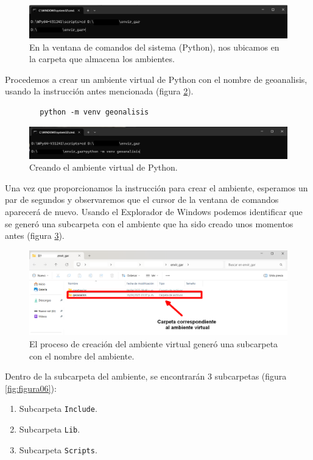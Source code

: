 \documentclass{article}
\begin{document}
	\begin{figure}[H]
		\centering
		\includegraphics[width=0.9\linewidth]{figura03}
		\caption{En la ventana de comandos del sistema (Python), nos ubicamos en la carpeta que almacena los ambientes.}
		\label{fig:figura03}
	\end{figure}
	
	Procedemos a crear un ambiente virtual de Python con el nombre de geoanalisis, usando la instrucción antes mencionada (figura \ref{fig:figura04}).
	\begin{verbatim}
		python -m venv geonalisis
	\end{verbatim}
	
	\begin{figure}[H]
		\centering
		\includegraphics[width=0.9\linewidth]{Figura04}
		\caption{Creando el ambiente virtual de Python.}
		\label{fig:figura04}
	\end{figure}
	
	Una vez que proporcionamos la instrucción para crear el ambiente, esperamos un par de segundos y observaremos que el cursor de la ventana de comandos aparecerá de nuevo. Usando el Explorador de Windows podemos identificar que se generó una subcarpeta con el ambiente que ha sido creado unos momentos antes (figura \ref{fig:figura05}).
	
	\begin{figure}[H]
		\centering
		\includegraphics[width=0.9\linewidth]{Figura05}
		\caption{El proceso de creación del ambiente virtual generó una subcarpeta con el nombre del ambiente.}
		\label{fig:figura05}
	\end{figure}
	
	Dentro de la subcarpeta del ambiente, se encontrarán 3 subcarpetas (figura \ref{fig:figura06}):
	\begin{enumerate}
		\item Subcarpeta \texttt{Include}.
		\item Subcarpeta \texttt{Lib}. 
		\item Subcarpeta \texttt{Scripts}.
	\end{enumerate}
	
\end{document}
